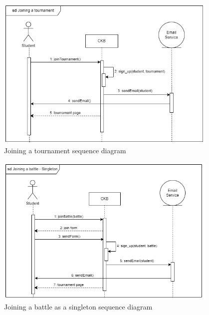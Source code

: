 \begin{figure}[H]
    \centering
    \includegraphics[width=0.95\textwidth]{images/seq_diagrams/joining_tournament.png}
    \caption{Joining a tournament sequence diagram}
    \label{fig:sequence_diagram}
\end{figure}
\clearpage

\begin{figure}[H]
    \centering
    \includegraphics[width=0.95\textwidth]{images/seq_diagrams/joining_battle-singleton.png}
    \caption{Joining a battle as a singleton sequence diagram}
    \label{fig:sequence_diagram}
\end{figure}
\clearpage

